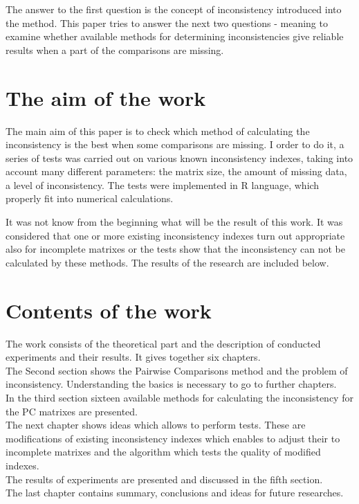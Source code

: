 The answer to the first question is the concept of inconsistency introduced into the method. This paper tries to answer the next two questions - meaning to examine whether available methods for determining inconsistencies give reliable results when a part of the comparisons are missing. 

\section{The aim of the work}
\label{sec:celePracy}
The main aim of this paper is to check which method of calculating the inconsistency is the best when some comparisons are missing. I order to do it, a series of tests was carried out on various known inconsistency indexes, taking into account many different parameters: the matrix size, the amount of missing data, a level of inconsistency.
The tests were implemented in R language, which properly fit into numerical calculations.

It was not know from the beginning what will be the result of this work. It was considered that one or more existing inconsistency indexes turn out appropriate also for incomplete matrixes or the tests show that the inconsistency can not be calculated by these methods. 
The results of the research are included below.

\section{Contents of the work}
\label{sec:zawartoscPracy}
The work consists of the theoretical part and the description of conducted experiments and their results. It gives together six chapters.\\
The Second section shows the Pairwise Comparisons method and the problem of inconsistency. Understanding the basics is necessary to go to further chapters.\\
In the third section sixteen available methods for calculating the inconsistency for the PC matrixes are presented. \\
The next chapter shows ideas which allows to perform tests. These are modifications of existing inconsistency indexes which enables  to adjust their to incomplete matrixes and the algorithm which tests the quality of modified indexes. \\
The results of experiments are presented and discussed in the fifth section.\\
The last chapter contains summary, conclusions and ideas for future researches.